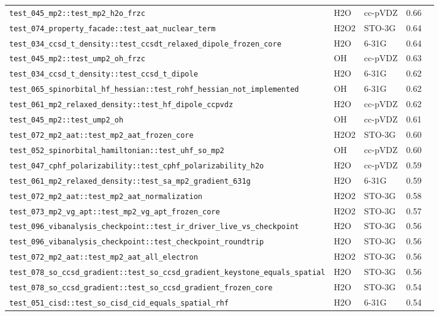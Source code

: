 \documentclass[10pt]{article}
\begin{document}
\begin{longtable}{l l l r c}
\texttt{test\_045\_mp2::test\_mp2\_h2o\_frzc} & H2O & cc-pVDZ & 0.66 &  \\
\texttt{test\_074\_property\_facade::test\_aat\_nuclear\_term} & H2O2 & STO-3G & 0.64 &  \\
\texttt{test\_034\_ccsd\_t\_density::test\_ccsdt\_relaxed\_dipole\_frozen\_core} & H2O & 6-31G & 0.64 &  \\
\texttt{test\_045\_mp2::test\_ump2\_oh\_frzc} & OH & cc-pVDZ & 0.63 &  \\
\texttt{test\_034\_ccsd\_t\_density::test\_ccsd\_t\_dipole} & H2O & 6-31G & 0.62 &  \\
\texttt{test\_065\_spinorbital\_hf\_hessian::test\_rohf\_hessian\_not\_implemented} & OH & 6-31G & 0.62 &  \\
\texttt{test\_061\_mp2\_relaxed\_density::test\_hf\_dipole\_ccpvdz} & H2O & cc-pVDZ & 0.62 &  \\
\texttt{test\_045\_mp2::test\_ump2\_oh} & OH & cc-pVDZ & 0.61 &  \\
\texttt{test\_072\_mp2\_aat::test\_mp2\_aat\_frozen\_core} & H2O2 & STO-3G & 0.60 &  \\
\texttt{test\_052\_spinorbital\_hamiltonian::test\_uhf\_so\_mp2} & OH & cc-pVDZ & 0.60 &  \\
\texttt{test\_047\_cphf\_polarizability::test\_cphf\_polarizability\_h2o} & H2O & cc-pVDZ & 0.59 &  \\
\texttt{test\_061\_mp2\_relaxed\_density::test\_sa\_mp2\_gradient\_631g} & H2O & 6-31G & 0.59 &  \\
\texttt{test\_072\_mp2\_aat::test\_mp2\_aat\_normalization} & H2O2 & STO-3G & 0.58 &  \\
\texttt{test\_073\_mp2\_vg\_apt::test\_mp2\_vg\_apt\_frozen\_core} & H2O2 & STO-3G & 0.57 &  \\
\texttt{test\_096\_vibanalysis\_checkpoint::test\_ir\_driver\_live\_vs\_checkpoint} & H2O & STO-3G & 0.56 &  \\
\texttt{test\_096\_vibanalysis\_checkpoint::test\_checkpoint\_roundtrip} & H2O & STO-3G & 0.56 &  \\
\texttt{test\_072\_mp2\_aat::test\_mp2\_aat\_all\_electron} & H2O2 & STO-3G & 0.56 &  \\
\texttt{test\_078\_so\_ccsd\_gradient::test\_so\_ccsd\_gradient\_keystone\_equals\_spatial} & H2O & STO-3G & 0.56 &  \\
\texttt{test\_078\_so\_ccsd\_gradient::test\_so\_ccsd\_gradient\_frozen\_core} & H2O & STO-3G & 0.54 &  \\
\texttt{test\_051\_cisd::test\_so\_cisd\_cid\_equals\_spatial\_rhf} & H2O & 6-31G & 0.54 &  \\

\end{longtable}
\end{document}
